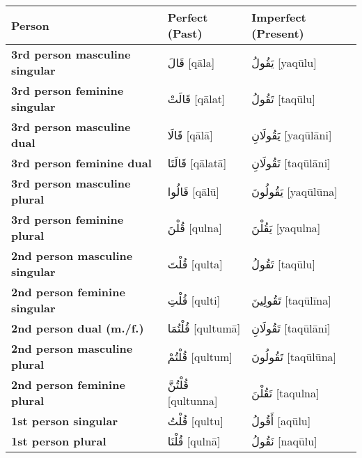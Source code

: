 \documentclass[letter,12pt]{article}
\begin{document}
\begin{longtable}{|>{\raggedright}p{3.5cm}|p{5cm}|p{5cm}|}
\hline
\textbf{Person} & \textbf{Perfect (Past)} & \textbf{Imperfect (Present)} \\
\hline
\textbf{3rd person masculine singular} & \textarabic{قَالَ} [qāla] & \textarabic{يَقُولُ} [yaqūlu] \\
\hline
\textbf{3rd person feminine singular} & \textarabic{قَالَتْ} [qālat] & \textarabic{تَقُولُ} [taqūlu] \\
\hline
\textbf{3rd person masculine dual} & \textarabic{قَالَا} [qālā] & \textarabic{يَقُولَانِ} [yaqūlāni] \\
\hline
\textbf{3rd person feminine dual} & \textarabic{قَالَتَا} [qālatā] & \textarabic{تَقُولَانِ} [taqūlāni] \\
\hline
\textbf{3rd person masculine plural} & \textarabic{قَالُوا} [qālū] & \textarabic{يَقُولُونَ} [yaqūlūna] \\
\hline
\textbf{3rd person feminine plural} & \textarabic{قُلْنَ} [qulna] & \textarabic{يَقُلْنَ} [yaqulna] \\
\hline
\textbf{2nd person masculine singular} & \textarabic{قُلْتَ} [qulta] & \textarabic{تَقُولُ} [taqūlu] \\
\hline
\textbf{2nd person feminine singular} & \textarabic{قُلْتِ} [qulti] & \textarabic{تَقُولِينَ} [taqūlīna] \\
\hline
\textbf{2nd person dual (m./f.)} & \textarabic{قُلْتُمَا} [qultumā] & \textarabic{تَقُولَانِ} [taqūlāni] \\
\hline
\textbf{2nd person masculine plural} & \textarabic{قُلْتُمْ} [qultum] & \textarabic{تَقُولُونَ} [taqūlūna] \\
\hline
\textbf{2nd person feminine plural} & \textarabic{قُلْتُنَّ} [qultunna] & \textarabic{تَقُلْنَ} [taqulna] \\
\hline
\textbf{1st person singular} & \textarabic{قُلْتُ} [qultu] & \textarabic{أَقُولُ} [aqūlu] \\
\hline
\textbf{1st person plural} & \textarabic{قُلْنَا} [qulnā] & \textarabic{نَقُولُ} [naqūlu] \\
\hline
\end{longtable}
\end{document}
